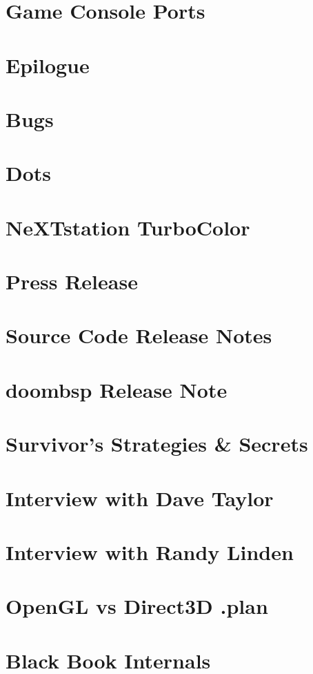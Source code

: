 \documentclass{book}
\newcommand\blankpage{%
    \null
    \thispagestyle{empty}%
    \addtocounter{page}{-1}%
    \newpage}
\newcommand*\cleartoleftpage{%
  \clearpage
  \ifodd\value{page}\hbox{}\newpage\fi
}
\begin{document}
    \chapter{Game Console Ports}        
          

    \chapter*{Epilogue}
      

    \appendix
    \appendixpage
      \chapter{Bugs}
      
    \chapter{Dots}  
      


    \chapter{NeXTstation TurboColor}
    
    
      \chapter{Press Release}
      
      \chapter{Source Code Release Notes}
      
      \chapter{doombsp Release Note}
      
      \chapter{Survivor's Strategies \& Secrets}
      
   
      \chapter{Interview with Dave Taylor}
      
      \chapter{Interview with Randy Linden}
            
      \chapter{OpenGL vs Direct3D .plan}
      
        \chapter{Black Book Internals}
    
    \cleartoleftpage %
    \blankpage
    \blankpage
    \blankpage
\end{document}
